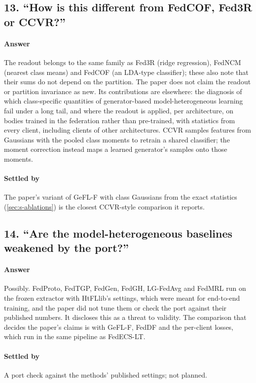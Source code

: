 \subsection*{13. ``How is this different from FedCOF, Fed3R or CCVR?''}

\paragraph{Answer} The readout belongs to the same family as Fed3R (ridge regression), FedNCM (nearest class means) and
FedCOF (an LDA-type classifier); these also note that their sums do not depend on the partition. The paper does not
claim the readout or partition invariance as new. Its contributions are elsewhere: the diagnosis of which
class-specific quantities of generator-based model-heterogeneous learning fail under a long tail, and where the readout
is applied, per architecture, on bodies trained in the federation rather than pre-trained, with statistics from every
client, including clients of other architectures. CCVR samples features from Gaussians with the pooled class moments
to retrain a shared classifier; the moment correction instead maps a learned generator's samples onto those moments.

\paragraph{Settled by} The paper's variant of GeFL-F with class Gaussians from the exact statistics
(\cref{sec:s-ablations}) is the closest CCVR-style comparison it reports.

\subsection*{14. ``Are the model-heterogeneous baselines weakened by the port?''}

\paragraph{Answer} Possibly. FedProto, FedTGP, FedGen, FedGH, LG-FedAvg and FedMRL run on the frozen extractor with
HtFLlib's settings, which were meant for end-to-end training, and the paper did not tune them or check the port
against their published numbers. It discloses this as a threat to validity. The comparison that decides the paper's
claims is with GeFL-F, FedDF and the per-client losses, which run in the same pipeline as FedECS-LT.

\paragraph{Settled by} A port check against the methods' published settings; not planned.

